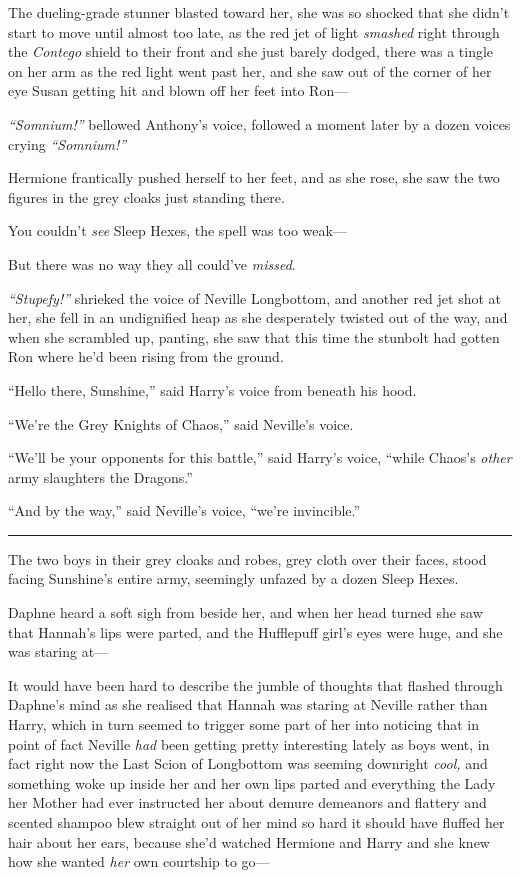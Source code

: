 The dueling-grade stunner blasted toward her, she was so shocked that
she didn't start to move until almost too late, as the red jet of light
\emph{smashed} right through the \emph{Contego} shield to their front
and she just barely dodged, there was a tingle on her arm as the red
light went past her, and she saw out of the corner of her eye Susan
getting hit and blown off her feet into Ron---

\emph{``Somnium!''} bellowed Anthony's voice, followed a moment later by
a dozen voices crying \emph{``Somnium!''}

Hermione frantically pushed herself to her feet, and as she rose, she
saw the two figures in the grey cloaks just standing there.

You couldn't \emph{see} Sleep Hexes, the spell was too weak---

But there was no way they all could've \emph{missed}.

\emph{``Stupefy!''} shrieked the voice of Neville Longbottom, and
another red jet shot at her, she fell in an undignified heap as she
desperately twisted out of the way, and when she scrambled up, panting,
she saw that this time the stunbolt had gotten Ron where he'd been
rising from the ground.

``Hello there, Sunshine,'' said Harry's voice from beneath his hood.

``We're the Grey Knights of Chaos,'' said Neville's voice.

``We'll be your opponents for this battle,'' said Harry's voice, ``while
Chaos's \emph{other} army slaughters the Dragons.''

``And by the way,'' said Neville's voice, ``we're invincible.''

\begin{center}\rule{3in}{0.4pt}\end{center}

The two boys in their grey cloaks and robes, grey cloth over their
faces, stood facing Sunshine's entire army, seemingly unfazed by a dozen
Sleep Hexes.

Daphne heard a soft sigh from beside her, and when her head turned she
saw that Hannah's lips were parted, and the Hufflepuff girl's eyes were
huge, and she was staring at---

It would have been hard to describe the jumble of thoughts that flashed
through Daphne's mind as she realised that Hannah was staring at Neville
rather than Harry, which in turn seemed to trigger some part of her into
noticing that in point of fact Neville \emph{had} been getting pretty
interesting lately as boys went, in fact right now the Last Scion of
Longbottom was seeming downright \emph{cool,} and something woke up
inside her and her own lips parted and everything the Lady her Mother
had ever instructed her about demure demeanors and flattery and scented
shampoo blew straight out of her mind so hard it should have fluffed her
hair about her ears, because she'd watched Hermione and Harry and she
knew how she wanted \emph{her} own courtship to go---

